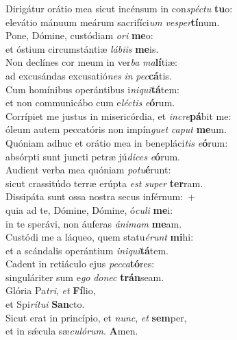 \evenverse Dirigátur orátio mea sicut incénsum in con\textit{spé}\textit{ctu} \textbf{tu}o:~\*\\
\evenverse elevátio mánuum meárum sacrifíci\textit{um} \textit{ve}\textit{sper}\textbf{tí}num.\\
\oddverse Pone, Dómine, custódiam \textit{o}\textit{ri} \textbf{me}o:~\*\\
\oddverse et óstium circumstántiæ \textit{lá}\textit{bi}\textit{is} \textbf{me}is.\\
\evenverse Non declínes cor meum in ver\textit{ba} \textit{ma}\textbf{lí}tiæ:~\*\\
\evenverse ad excusándas excusatió\textit{nes} \textit{in} \textit{pec}\textbf{cá}tis.\\
\oddverse Cum homínibus operántibus i\textit{ni}\textit{qui}\textbf{tá}tem:~\*\\
\oddverse et non communicábo cum e\textit{lé}\textit{ctis} \textit{e}\textbf{ó}rum.\\
\evenverse Corrípiet me justus in misericórdia, et \textit{in}\textit{cre}\textbf{pá}bit me:~\*\\
\evenverse óleum autem peccatóris non impín\textit{guet} \textit{ca}\textit{put} \textbf{me}um.\\
\oddverse Quóniam adhuc et orátio mea in benepláci\textit{tis} \textit{e}\textbf{ó}rum:~\*\\
\oddverse absórpti sunt juncti petræ jú\textit{di}\textit{ces} \textit{e}\textbf{ó}rum.\\
\evenverse Audient verba mea quóniam \textit{po}\textit{tu}\textbf{é}runt:~\*\\
\evenverse sicut crassitúdo terræ erúpta \textit{est} \textit{su}\textit{per} \textbf{ter}ram.\\
\oddverse Dissipáta sunt ossa nostra secus inférnum:~+\\
\oddverse  quia ad te, Dómine, Dómine, ó\textit{cu}\textit{li} \textbf{me}i:~\*\\
\oddverse in te sperávi, non áuferas \textit{á}\textit{ni}\textit{mam} \textbf{me}am.\\
\evenverse Custódi me a láqueo, quem statu\textit{é}\textit{runt} \textbf{mi}hi:~\*\\
\evenverse et a scándalis operántium \textit{i}\textit{ni}\textit{qui}\textbf{tá}tem.\\
\oddverse Cadent in retiáculo ejus \textit{pec}\textit{ca}\textbf{tó}res:~\*\\
\oddverse singuláriter sum e\textit{go} \textit{do}\textit{nec} \textbf{trán}seam.\\
\evenverse Glória Pa\textit{tri}, \textit{et} \textbf{Fí}lio,~\*\\
\evenverse et Spi\textit{rí}\textit{tu}\textit{i} \textbf{San}cto.\\
\oddverse Sicut erat in princípio, et \textit{nunc}, \textit{et} \textbf{sem}per,~\*\\
\oddverse et in sǽcula sæ\textit{cu}\textit{ló}\textit{rum}. \textbf{A}men.\\
